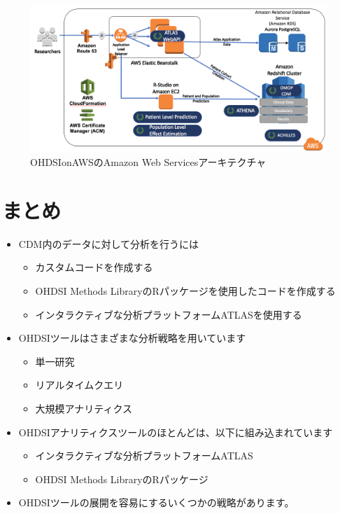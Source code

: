 \documentclass[
  11pt]{book}
\makeatletter
\providecommand{\tightlist}{%
  \setlength{\itemsep}{0pt}\setlength{\parskip}{0pt}}
\newenvironment{kframe}{%
\medskip{}
\setlength{\fboxsep}{.8em}
 \def\at@end@of@kframe{}%
 \ifinner\ifhmode%
  \def\at@end@of@kframe{\end{minipage}}%
  \begin{minipage}{\columnwidth}%
 \fi\fi%
 \def\FrameCommand##1{\hskip\@totalleftmargin \hskip-\fboxsep
 \colorbox{myShadeColor}{##1}\hskip-\fboxsep
     \hskip-\linewidth \hskip-\@totalleftmargin \hskip\columnwidth}%
 \MakeFramed {\advance\hsize-\width
   \@totalleftmargin\z@ \linewidth\hsize
   \@setminipage}}%
 {\par\unskip\endMakeFramed%
 \at@end@of@kframe}
\newenvironment{rmdblock}[1]
  {
  \begin{itemize}
  \renewcommand{\labelitemi}{
    \raisebox{-.7\height}[0pt][0pt]{
      {\setkeys{Gin}{width=3em,keepaspectratio}\texttt{[image: images/\#1]}}
    }
  }
  \setlength{\fboxsep}{1em}
  \begin{kframe}
  \item
  }
  {
  \end{kframe}
  \end{itemize}
  }
\newenvironment{rmdsummary}
  {\begin{rmdblock}{summary}}
  {\end{rmdblock}}
\theoremstyle{definition}
\theoremstyle{definition}
\theoremstyle{definition}
\theoremstyle{definition}
\theoremstyle{remark}
\makeatother
\begin{document}
\begin{figure}

{\centering \includegraphics[width=1\linewidth]{images/OhdsiAnalyticsTools/OHDSIonAWSDiagram} 

}

\caption{OHDSIonAWSのAmazon Web Servicesアーキテクチャ}\label{fig:ohdsionawsDiagram}
\end{figure}

\section{まとめ}\label{ux307eux3068ux3081-6}

\begin{rmdsummary}
\begin{itemize}
\tightlist
\item
  CDM内のデータに対して分析を行うには

  \begin{itemize}
  \tightlist
  \item
    カスタムコードを作成する
  \item
    OHDSI Methods LibraryのRパッケージを使用したコードを作成する
  \item
    インタラクティブな分析プラットフォームATLASを使用する
  \end{itemize}
\item
  OHDSIツールはさまざまな分析戦略を用いています

  \begin{itemize}
  \tightlist
  \item
    単一研究
  \item
    リアルタイムクエリ
  \item
    大規模アナリティクス
  \end{itemize}
\item
  OHDSIアナリティクスツールのほとんどは、以下に組み込まれています

  \begin{itemize}
  \tightlist
  \item
    インタラクティブな分析プラットフォームATLAS
  \item
    OHDSI Methods LibraryのRパッケージ
  \end{itemize}
\item
  OHDSIツールの展開を容易にするいくつかの戦略があります。
\end{itemize}
\end{rmdsummary}
\end{document}
